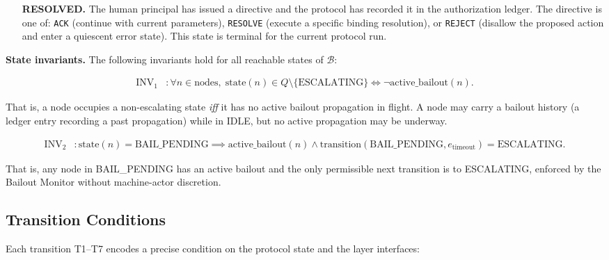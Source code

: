 \begin{itemize}
\item[\textbf{RESOLVED.}] The human principal has issued a directive and the protocol has recorded it in the authorization ledger. The directive is one of: \texttt{ACK} (continue with current parameters), \texttt{RESOLVE} (execute a specific binding resolution), or \texttt{REJECT} (disallow the proposed action and enter a quiescent error state). This state is terminal for the current protocol run.
\end{itemize}

\bigskip
\noindent\textbf{State invariants.} The following invariants hold for all reachable states of $\mathcal{B}$:

\begin{align}
\text{INV}_1 &: \forall n \in \text{nodes},\; \text{state}(n) \in Q \setminus \{\text{ESCALATING}\} \iff \neg\text{active\_bailout}(n). \tag{INV-1}
\end{align}

That is, a node occupies a non-escalating state \emph{iff} it has no active bailout propagation in flight. A node may carry a bailout history (a ledger entry recording a past propagation) while in IDLE, but no active propagation may be underway.

\begin{align}
\text{INV}_2 &: \text{state}(n) = \text{BAIL\_PENDING} \implies \text{active\_bailout}(n) \land \text{transition}(\text{BAIL\_PENDING}, e_{\text{timeout}}) = \text{ESCALATING}. \tag{INV-2}
\end{align}

That is, any node in BAIL\_PENDING has an active bailout and the only permissible next transition is to ESCALATING, enforced by the Bailout Monitor without machine-actor discretion.

\subsection{Transition Conditions}\label{sec:transitions}

Each transition T1–T7 encodes a precise condition on the protocol state and the \bxthree{} layer interfaces:

